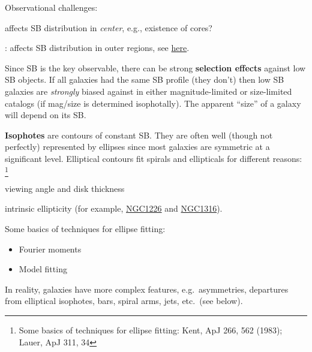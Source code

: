 \documentclass{article}
\begin{document}
Observational challenges:
\begin{description}[labelindent=2em, labelwidth=5em]
    \item [seeing:] affects SB distribution in \emph{center},
        e.g., existence of cores?
    \item [sky determination]: affects SB distribution in outer regions,
        see \href{http://astronomy.nmsu.edu/holtz/a555/html/diagrams/a616/sky.htm}
        {here}.
\end{description}

Since SB is the key observable, there can be strong \textbf{selection effects}
against low SB objects. If all galaxies had the same SB profile (they don't)
then low SB galaxies are \emph{strongly} biased against in either
magnitude-limited or size-limited catalogs (if mag/size is determined isophotally).
The apparent ``size'' of a galaxy will depend on its SB.

\textbf{Isophotes} are contours of constant SB.
They are often well (though not perfectly) represented by ellipses since
most galaxies are symmetric at a significant level.
Elliptical contours fit spirals and ellipticals for different reasons:
\footnote{Some basics of techniques for ellipse fitting:
Kent, ApJ 266, 562 (1983); Lauer, ApJ 311, 34}
\begin{description}[align=right, labelwidth=5em]
    \item [Spiral] viewing angle and disk thickness
    \item [Elliptical] intrinsic ellipticity (for example,
        \href{http://astronomy.nmsu.edu/holtz/a555/resources/n1226.h.jpg}
        {NGC1226} and
        \href{http://astronomy.nmsu.edu/holtz/a555/resources/n1316.h.jpg}
        {NGC1316}).
\end{description}
Some basics of techniques for ellipse fitting:
\begin{itemize}
    \item Fourier moments
    \item Model fitting
\end{itemize}
In reality, galaxies have more complex features, e.g.\ asymmetries,
departures from elliptical isophotes, bars, spiral arms, jets, etc.\
(see below).
\end{document}
